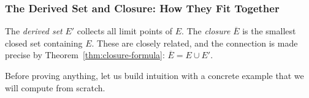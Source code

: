 %

\subsubsection{The Derived Set and Closure: How They Fit Together}
\label{sec:derived-set-closure-connection}

The \emph{derived set} $E'$ collects all limit points of $E$.
The \emph{closure} $\overline{E}$ is the smallest closed set containing $E$.
These are closely related, and the connection is made precise by
Theorem~\ref{thm:closure-formula}: $\overline{E} = E \cup E'$.

Before proving anything, let us build intuition with a concrete example
that we will compute from scratch.

